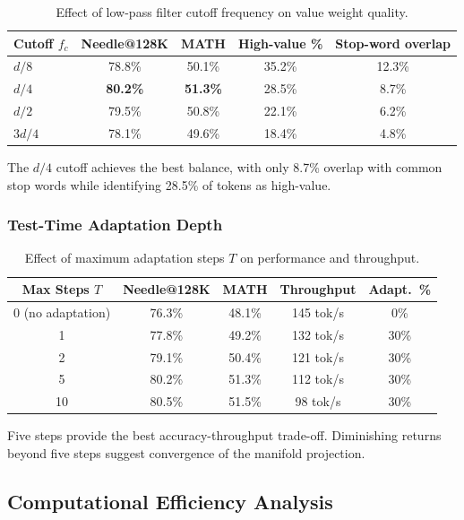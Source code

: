 \documentclass[twocolumn]{article}
\begin{document}
\begin{table}[htbp]
\centering
\caption{Effect of low-pass filter cutoff frequency on value weight quality.}
\label{tab:cutoff-sensitivity}
\begin{tabular}{lcccc}
\toprule
\textbf{Cutoff $f_c$} & \textbf{Needle@128K} & \textbf{MATH} & \textbf{High-value \%} & \textbf{Stop-word overlap} \\
\midrule
$d/8$ & 78.8\% & 50.1\% & 35.2\% & 12.3\% \\
$d/4$ & \textbf{80.2\%} & \textbf{51.3\%} & 28.5\% & 8.7\% \\
$d/2$ & 79.5\% & 50.8\% & 22.1\% & 6.2\% \\
$3d/4$ & 78.1\% & 49.6\% & 18.4\% & 4.8\% \\
\bottomrule
\end{tabular}
\end{table}

The $d/4$ cutoff achieves the best balance, with only 8.7\% overlap with common stop words while identifying 28.5\% of tokens as high-value.

\subsubsection{Test-Time Adaptation Depth}

\begin{table}[htbp]
\centering
\caption{Effect of maximum adaptation steps $T$ on performance and throughput.}
\label{tab:adaptation-depth}
\begin{tabular}{ccccc}
\toprule
\textbf{Max Steps $T$} & \textbf{Needle@128K} & \textbf{MATH} & \textbf{Throughput} & \textbf{Adapt.\ \%} \\
\midrule
0 (no adaptation) & 76.3\% & 48.1\% & 145 tok/s & 0\% \\
1 & 77.8\% & 49.2\% & 132 tok/s & 30\% \\
2 & 79.1\% & 50.4\% & 121 tok/s & 30\% \\
5 & 80.2\% & 51.3\% & 112 tok/s & 30\% \\
10 & 80.5\% & 51.5\% & 98 tok/s & 30\% \\
\bottomrule
\end{tabular}
\end{table}

Five steps provide the best accuracy-throughput trade-off. Diminishing returns beyond five steps suggest convergence of the manifold projection.

\subsection{Computational Efficiency Analysis}
\end{document}
